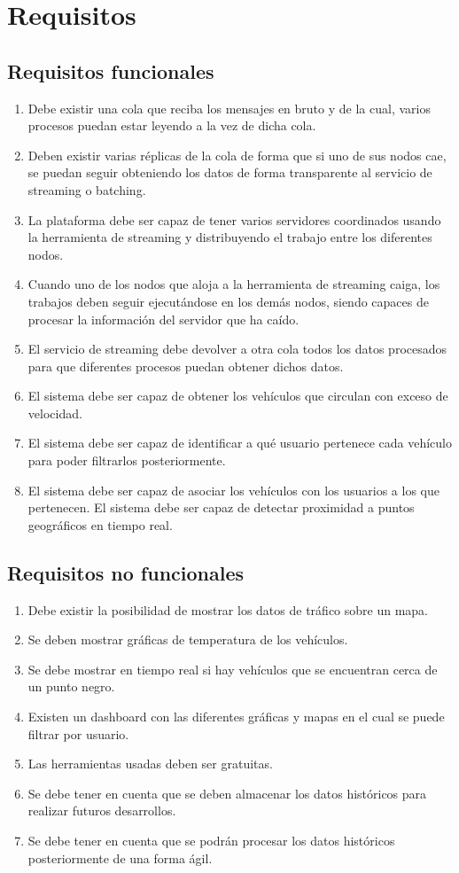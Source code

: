 
\section{Requisitos\label{requisitos}}

\subsection{Requisitos funcionales\label{RF}}
\begin{enumerate}
	\item Debe existir una cola que reciba los mensajes en bruto y de la cual, varios procesos puedan estar leyendo a la vez de dicha cola.
	\item Deben existir varias réplicas de la cola de forma que si uno de sus nodos cae, se puedan seguir obteniendo los datos de forma transparente al servicio de streaming o batching.
	\item La plataforma debe ser capaz de tener varios servidores coordinados usando la herramienta de streaming y distribuyendo el trabajo entre los diferentes nodos.
	\item Cuando uno de los nodos que aloja a la herramienta de streaming caiga, los trabajos deben seguir ejecutándose en los demás nodos, siendo capaces de procesar la información del servidor que ha caído.
	\item El servicio de streaming debe devolver a otra cola todos los datos procesados para que diferentes procesos puedan obtener dichos datos.
	\item El sistema debe ser capaz de obtener los vehículos que circulan con exceso de velocidad.
	\item El sistema debe ser capaz de identificar a qué usuario pertenece cada vehículo para poder filtrarlos posteriormente.
	\item El sistema debe ser capaz de asociar los vehículos con los usuarios a los que pertenecen.
El sistema debe ser capaz de detectar proximidad a puntos geográficos en tiempo real.
\end{enumerate}
\subsection{Requisitos no funcionales\label{RNF}}
\begin{enumerate}
	\item Debe existir la posibilidad de mostrar los datos de tráfico sobre un mapa.
	\item Se deben mostrar gráficas de temperatura de los vehículos.
	\item Se debe mostrar en tiempo real si hay vehículos que se encuentran cerca de un punto negro.
	\item Existen un dashboard con las diferentes gráficas y mapas en el cual se puede filtrar por usuario.
	\item Las herramientas usadas deben ser gratuitas.
	\item Se debe tener en cuenta que se deben almacenar los datos históricos para realizar futuros desarrollos.
	\item Se debe tener en cuenta que se podrán procesar los datos históricos posteriormente de una forma ágil.
\end{enumerate}

